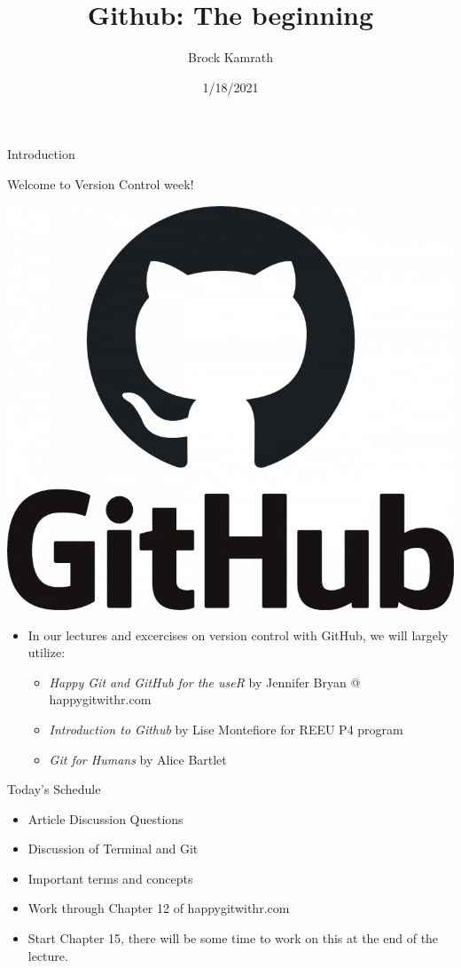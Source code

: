 \documentclass[
  ignorenonframetext,
]{beamer}
\title{Github: The beginning}
\author{Brock Kamrath}
\date{1/18/2021}
\providecommand{\tightlist}{%
  \setlength{\itemsep}{0pt}\setlength{\parskip}{0pt}}
\begin{document}
\frame{\titlepage}

\begin{frame}{Introduction}
\protect\hypertarget{introduction}{}

Welcome to Version Control week!

\includegraphics[width=10.67in]{pres_figs/github_logo2}

\begin{itemize}
\tightlist
\item
  In our lectures and excercises on version control with GitHub, we will
  largely utilize:

  \begin{itemize}
  \tightlist
  \item
    \emph{Happy Git and GitHub for the useR} by Jennifer Bryan @
    happygitwithr.com
  \item
    \emph{Introduction to Github} by Lise Montefiore for REEU P4 program
  \item
    \emph{Git for Humans} by Alice Bartlet
  \end{itemize}
\end{itemize}

\end{frame}

\begin{frame}{Today's Schedule}
\protect\hypertarget{todays-schedule}{}

\begin{itemize}
\tightlist
\item
  Article Discussion Questions
\item
  Discussion of Terminal and Git
\item
  Important terms and concepts
\item
  Work through Chapter 12 of happygitwithr.com
\item
  Start Chapter 15, there will be some time to work on this at the end
  of the lecture.
\end{itemize}

\end{frame}
\end{document}
